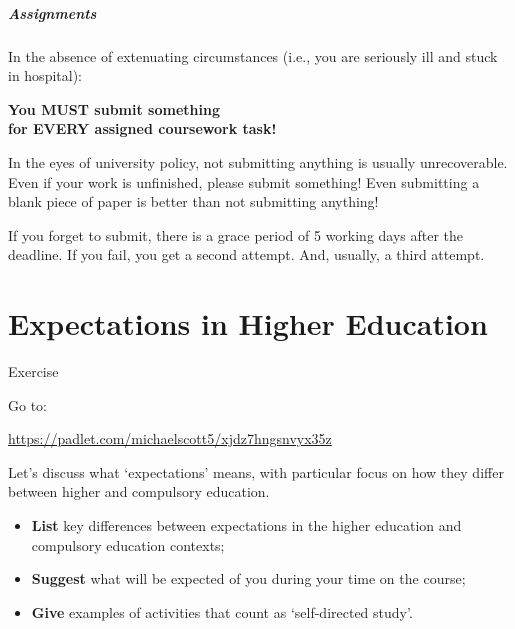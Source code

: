 \begin{frame}
	\frametitle{Assignments}
		
	In the absence of extenuating circumstances (i.e., you are seriously ill and stuck in hospital):
	
	\begin{Large}
		\begin{center}
			\textbf{You MUST submit something \\ for EVERY assigned coursework task!}
		\end{center}
	\end{Large}
	
	In the eyes of university policy, not submitting anything is usually unrecoverable. Even if your work is unfinished, please submit something! Even submitting a blank piece of paper is better than not submitting anything! 
	
		\vspace{0.5em}
	
	If you forget to submit, there is a grace period of 5 working days after the deadline. If you fail, you get a second attempt. And, usually, a third attempt.
	
\end{frame}


\part{Expectations in Higher Education}
\frame{\partpage}

\begin{frame}{Exercise}

    Go to:
    
    \vspace{0.5em}
    
    \small{\url{https://padlet.com/michaelscott5/xjdz7hngsnvyx35z}}
    
    \vspace{1em}
    
    Let's discuss what `expectations' means, with particular focus on how they differ between higher and compulsory education.
    
    \vspace{0.5em}

	\begin{itemize}
	    \item \textbf{List} key differences between expectations in the higher education and compulsory education contexts;
		\item \textbf{Suggest} what will be expected of you during your time on the course;
		\item 	\textbf{Give} examples of activities that count as `self-directed study'.
	\end{itemize}

\end{frame}

